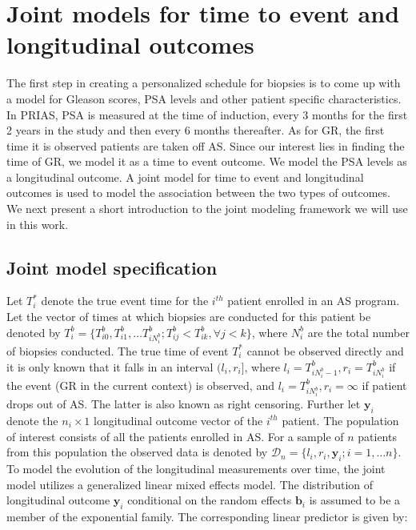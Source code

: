 
\section{Joint models for time to event and longitudinal outcomes}
\label{sec : jm_framework}
The first step in creating a personalized schedule for biopsies is to come up with a model for Gleason scores, PSA levels and other patient specific characteristics. In PRIAS, PSA is measured at the time of induction, every 3 months for the first 2 years in the study and then every 6 months thereafter. As for GR, the first time it is observed patients are taken off AS. Since our interest lies in finding the time of GR, we model it as a time to event outcome. We model the PSA levels as a longitudinal outcome. A joint model for time to event and longitudinal outcomes is used to model the association between the two types of outcomes. We next present a short introduction to the joint modeling framework we will use in this work.

\subsection{Joint model specification}
\label{subsec : jm_specification}
Let $T_i^*$ denote the true event time for the $i^{th}$ patient enrolled in an AS program. Let the vector of times at which biopsies are conducted for this patient be denoted by $T_i^b = \{T^b_{i0}, T^b_{i1}, \ldots T^b_{i{N_i^b}}; T^b_{ij} < T^b_{ik}, \forall j<k\}$, where $N_i^b$ are the total number of biopsies conducted. The true time of event $T_i^*$ cannot be observed directly and it is only known that it falls in an interval $(l_i, r_i]$, where $l_i = T^b_{i{N_i^b - 1}}, r_i = T^b_{i{N_i^b}}$ if the event (GR in the current context) is observed, and $l_i = T^b_{i{N_i^b}}, r_i=\infty$ if patient drops out of AS. The latter is also known as right censoring. Further let $\boldsymbol{y}_i$ denote the $n_i \times 1$ longitudinal outcome vector of the $i^{th}$ patient. The population of interest consists of all the patients enrolled in AS. For a sample of $n$ patients from this population the observed data is denoted by $\mathcal{D}_n = \{l_i, r_i, \boldsymbol{y}_i; i = 1, \ldots n\}$.\\

To model the evolution of the longitudinal measurements over time, the joint model utilizes a generalized linear mixed effects model. The distribution of longitudinal outcome $\boldsymbol{y}_i$ conditional on the random effects $\boldsymbol{b}_i$ is assumed to be a member of the exponential family. The corresponding linear predictor is given by:

